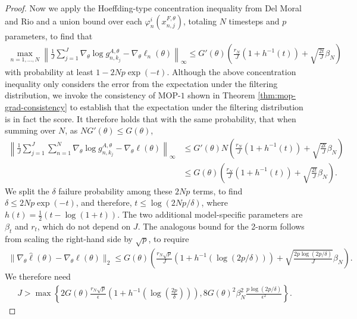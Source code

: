 \begin{proof}
Now we apply the Hoeffding-type concentration inequality from Del Moral and Rio \cite{delMoral11} and a union bound over each $\varphi_n^i(x_{n,j}^{F,\theta})$, totaling $N$ timesteps and $p$ parameters, to find that
\begin{align}
    \max_{n=1,...,N} \left\lVert\frac{1}{J}\sum_{j=1}^J\nabla_\theta \log g_{n,k_j}^{A,\theta} - \nabla_\theta \ell_n(\theta) \right\rVert_{\infty} \leq G'(\theta)\left(\frac{r_N}{J}(1+h^{-1}(t)) + \sqrt{\frac{2t}{J}}\beta_N \right)
\end{align}
with probability at least $1-2Np\exp(-t)$. Although the above concentration inequality only considers the error from the expectation under the filtering distribution, we invoke the consistency of MOP-$1$ shown in Theorem \ref{thm:mop-grad-consistency} to establish that the expectation under the filtering distribution is in fact the score. It therefore holds that with the same probability, that when summing over $N$, as $NG'(\theta) \leq G(\theta)$, 
\begin{align}
    \left\lVert\frac{1}{J}\sum_{j=1}^J\sum_{n=1}^N\nabla_\theta \log g_{n,k_j}^{A,\theta} - \nabla_\theta \ell(\theta) \right\rVert_{\infty} 
    &\leq G'(\theta)N\left(\frac{r_N}{J}(1+h^{-1}(t)) + \sqrt{\frac{2t}{J}}\beta_N \right)\\
    &\leq G(\theta)\left(\frac{r_N}{J}(1+h^{-1}(t)) + \sqrt{\frac{2t}{J}}\beta_N \right).
\end{align}
We split the $\delta$ failure probability among these $2Np$ terms, to find $\delta\leq2Np\exp(-t)$, and therefore, $t\leq\log(2Np/\delta)$, where $h(t) = \frac{1}{2}(t - \log(1+t))$. 
The two additional model-specific parameters are $\beta_t$ and $r_t$, which do not depend on $J$. 
The analogous bound for the 2-norm follows from scaling the right-hand side by $\sqrt{p}$, to require 
\begin{align}
    \|\nabla_\theta \hat\ell(\theta) - \nabla_\theta \ell(\theta)\|_2 \leq G(\theta)\left(\frac{r_N\sqrt{p}}{J}(1+h^{-1}(\log(2p/\delta))) + \sqrt{\frac{2p\log(2p/\delta)}{J}}\beta_N\right).
\end{align}
We therefore need 
\begin{align}
    J > \max\left\{2G(\theta)\frac{r_N\sqrt{p}}{\epsilon}\left(1+h^{-1}\left(\log\left(\frac{2p}{\delta}\right)\right)\right), 8G(\theta)^2\beta_N^2\frac{p\log(2p/\delta)}{\epsilon^2}\right\}.
\end{align}

\end{proof}


